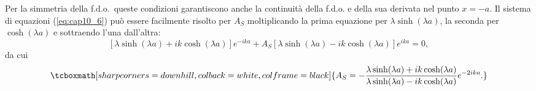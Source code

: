 Per la simmetria della f.d.o.~queste condizioni garantiscono anche la continuità della f.d.o. e della sua derivata nel punto $x=-a$. Il sistema di equazioni (\ref{eq:cap10_6}) può essere facilmente risolto per $A_S$ moltiplicando la prima equazione per $\lambda \sinh (\lambda a)$, la seconda per $\cosh (\lambda a)$ e sottraendo l'una dall'altra:
	\begin{equation}
		\left[\lambda \sinh (\lambda a)+ ik\cosh (\lambda a) \right]e^{-ika}+ A_S \left[\lambda \sinh (\lambda a)-ik \cosh (\lambda a) \right]e^{ika}=0,
	\end{equation}
da cui
	\begin{equation}
		\tcboxmath[sharp corners=downhill, colback=white, colframe=black]{	
			A_S=-\frac{\lambda \sinh (\lambda a)+ik \cosh (\lambda a)}{\lambda \sinh (\lambda a)-ik \cosh (\lambda a)}e^{-2ika}.
			}
	\label{eq:cap10_7}
	\end{equation}\\
	
